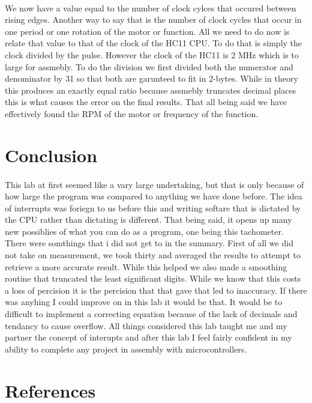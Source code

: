 \documentclass[12pt]{report}
\begin{document}
	\paragraph*{}
		We now have a value equal to the number of clock cylces that occured between rising edges.  Another way to say that is the number of clock cycles that occur in one period or one rotation of the motor or function.  All we need to do now is relate that value to that of the clock of the HC11 CPU.  To do that is simply the clock divided by the pulse.  However the clock of the HC11 is 2 MHz which is to large for assmebly.  To do the division we first divided both the numerator and denominator by 31 so that both are garunteed to fit in 2-bytes.  While in theory this produces an exactly equal ratio because assmebly truncates decimal places this is what causes the error on the final results.  That all being said we have effectively found the RPM of the motor or frequency of the function.
\section*{Conclusion}
	\paragraph*{}
		This lab at first seemed like a vary large undertaking, but that is only because of how large the program was compared to anything we have done before.  The idea of interrupts was foriegn to us before this and writing softare that is dictated by the CPU rather than dictating is different.  That being said, it opens up many new possiblies of what you can do as a program, one being this tachometer.  There were somthings that i did not get to in the summary.  First of all we did not take on measurement, we took thirty and averaged the results to attempt to retrieve a more accurate result.  While this helped we also made a smoothing routine that truncated the least significant digits.  While we know that this costs a loss of percision it is the percision that that gave that led to inaccuracy.  If there was anyhing I could improve on in this lab it would be that.  It would be to difficult to implement a correcting equation because of the lack of decimals and tendancy to cause overflow.  All things considered this lab taught me and my partner the concept of interupts and after this lab I feel fairly confident in my ability to complete any project in assembly with microcontrollers.

\section*{References}
\end{document}
